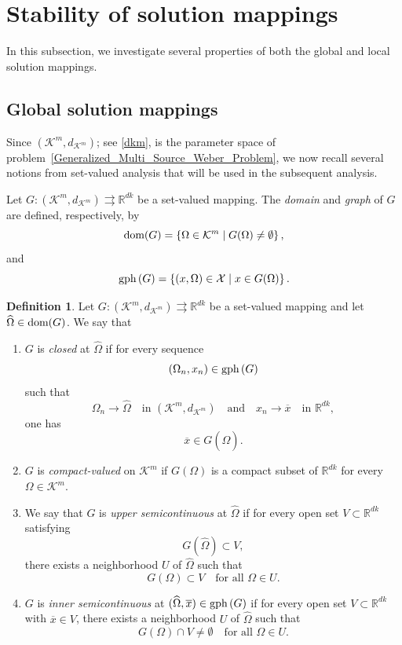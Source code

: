 \documentclass[sn-mathphys-num]{sn-jnl}%
\def\Hat{\widehat}
\def\gph{\mbox{\rm gph}\,}
\def\dom{\mbox{\rm dom}}
\theoremstyle{definition}
\newtheorem{definition}[theorem]{Definition}
\begin{document}
\section{Stability of solution mappings}
\label{solu}
In this subsection, we investigate several properties of both the global and local solution mappings.

\subsection{Global solution mappings}

Since $(\mathcal{K}^m,d_{\mathcal{K}^m})$; see \eqref{dkm}, is the parameter space of problem~\eqref{Generalized_Multi_Source_Weber_Problem}, we now recall several notions from set-valued analysis that will be used in the subsequent analysis.

Let $G:(\mathcal{K}^m,d_{\mathcal{K}^m})\rightrightarrows \mathbb{R}^{dk}$ be a set-valued mapping. The \textit{domain} and \textit{graph} of $G$ are defined, respectively, by
\[
\dom(G)=\left\{\Omega\in\mathcal{K}^m \mid G(\Omega)\neq\emptyset\right\},
\]
and
\[
\gph(G)=\left\{(x,\Omega)\in\mathcal{X}\mid x\in G(\Omega)\right\}.
\]


\begin{definition}
	Let $G:(\mathcal{K}^m,d_{\mathcal{K}^m})\rightrightarrows \mathbb{R}^{dk}$ be a set-valued mapping and let $\Hat \Omega\in \dom(G)$. We say that
	\begin{enumerate}
		\item  $G$ is \textit{closed} at $\Hat \Omega$ if for every sequence
		\[
		(\Omega_n,x_n)\in \gph(G)
		\]
		such that
		\[
		\Omega_n\to \Hat \Omega\quad \text{in }(\mathcal{K}^m,d_{\mathcal{K}^m})
		\quad \text{and} \quad
		x_n\to \overline{x}\quad \text{in }\mathbb{R}^{dk},
		\]
		one has
		\[
		\overline{x}\in G(\Hat \Omega).
		\]
		
		\item $G$ is \textit{compact-valued} on $\mathcal{K}^m$ if $G(\Omega)$ is a compact subset of $\mathbb{R}^{dk}$ for every $\Omega\in \mathcal{K}^m$.
		\item We say that $G$ is \textit{upper semicontinuous} at $\Hat \Omega$ if for every open set $V\subset \mathbb{R}^{dk}$ satisfying
		\[
		G(\Hat \Omega)\subset V,
		\]
		there exists a neighborhood $U$ of $\Hat \Omega$ such that
		\[
		G(\Omega)\subset V \quad \text{for all } \Omega\in U.
		\]
		
		\item $G$ is \textit{inner semicontinuous} at $(\Hat \Omega,\overline{x})\in \gph(G)$ if for every open set $V\subset \mathbb{R}^{dk}$ with $\overline{x}\in V$, there exists a neighborhood $U$ of $\Hat \Omega$ such that
		\[
		G(\Omega)\cap V\neq \emptyset \quad \text{for all } \Omega\in U.
		\]
	\end{enumerate}
\end{definition}
\end{document}
